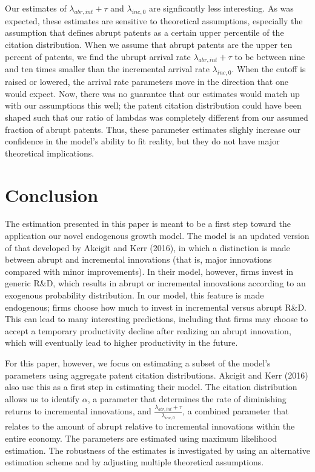 \documentclass[letterpaper,12pt]{article}
\theoremstyle{definition}
\begin{document}
Our estimates of $\lambda_{abr, int} + \tau$ and $\lambda_{inc,0}$ are signficantly less interesting. As was expected, these estimates are sensitive to theoretical assumptions, especially the assumption that defines abrupt patents as a certain upper percentile of the citation distribution. When we assume that abrupt patents are the upper ten percent of patents, we find the ubrupt arrival rate $\lambda_{abr, int} + \tau$ to be between nine and ten times smaller than the incremental arrival rate $\lambda_{inc,0}$. When the cutoff is raised or lowered, the arrival rate parameters move in the direction that one would expect. Now, there was no guarantee that our estimates would match up with our assumptions this well; the patent citation distribution could have been shaped such that our ratio of lambdas was completely different from our assumed fraction of abrupt patents. Thus, these parameter estimates slighly increase our confidence in the model's ability to fit reality, but they do not have major theoretical implications.

\section{Conclusion}\label{sec:Conclusion}
The estimation presented in this paper is meant to be a first step toward the application our novel endogenous growth model. The model is an updated version of that developed by Akcigit and Kerr (2016), in which a distinction is made between abrupt and incremental innovations (that is, major innovations compared with minor improvements). In their model, however, firms invest in generic R\&D, which results in abrupt or incremental innovations according to an exogenous probability distribution. In our model, this feature is made endogenous; firms choose how much to invest in incremental versus abrupt R\&D. This can lead to many interesting predictions, including that firms may choose to accept a temporary productivity decline after realizing an abrupt innovation, which will eventually lead to higher productivity in the future.

For this paper, however, we focus on estimating a subset of the model's parameters using aggregate patent citation distributions. Akcigit and Kerr (2016) also use this as a first step in estimating their model. The citation distribution allows us to identify $\alpha$, a parameter that determines the rate of diminishing returns to incremental innovations, and $\frac{\lambda_{abr, int} + \tau}{\lambda_{inc,0}}$, a combined parameter that relates to the amount of abrupt relative to incremental innovations within the entire economy. The parameters are estimated using maximum likelihood estimation. The robustness of the estimates is investigated by using an alternative estimation scheme and by adjusting multiple theoretical assumptions.
\end{document}
